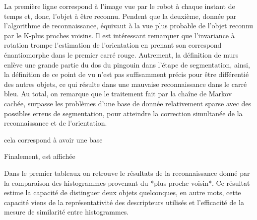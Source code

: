 La première ligne correspond à l'image vue par le robot à chaque instant de temps et, donc, l'objet à être reconnu. Pendent que la deuxième, donnée par l'algorithme de reconnaissance, équivaut à la vue plus probable de l'objet reconnu par le K-plus proches voisins. Il est intéressant remarquer que l'invariance à rotation trompe l'estimation de l'orientation en prenant son correspond énantiomorphe dans le premier carré rouge. Autrement, la définition de murs enlève une grande partie du dos du pingouin dans l'étape de segmentation, ainsi, la définition de ce point de vu n'est pas suffisamment précis pour être différentié des autres objets, ce qui résulte dans une mauvaise reconnaissance dans le carré bleu. Au total, on remarque que le traitement fait par la chaîne de Markov cachée, surpasse les problèmes d'une base de donnée relativement sparse avec des possibles erreus de segmentation, pour atteindre la correction simultanée de la reconnaissance et de l'orientation. 

cela correspond à avoir une base

Finalement,  est affichée

\begin{figure}[H]
\end{figure}


{\color{green}
Dans le premier tableaux on retrouve le résultats de la reconnaissance donné par la comparaison des histogrammes provenant du *plus proche voisin*. Ce résultat estime la capacité de distinguer deux objets quelconques, en autre mots, cette capacité viens de la représentativité des descripteurs utilisés et l'efficacité de la mesure de similarité entre histogrammes.
}
